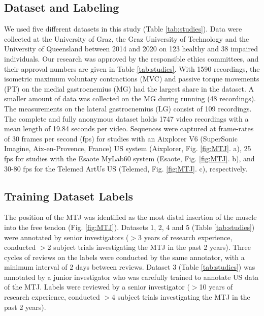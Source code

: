 \documentclass[journal,twoside,web]{ieeecolor}
\begin{document}
\subsection{Dataset and Labeling}
\label{sec:methods.data}
We used five different datasets in this study (Table \ref{tab:studies}). Data were collected at the University of Graz, the Graz University of Technology and the University of Queensland between 2014 and 2020 on 123 healthy and 38 impaired individuals. Our research was approved by the responsible ethics committees, and their approval numbers are given in Table \ref{tab:studies}. With 1590 recordings, the isometric maximum voluntary contractions (MVC) and passive torque movements (PT) on the medial gastrocnemius (MG) had the largest share in the dataset. A smaller amount of data was collected on the MG during running (48 recordings). The measurements on the lateral gastrocnemius (LG) consist of 109 recordings. The complete and fully anonymous dataset holds 1747 video recordings with a mean length of 19.84 seconds per video. Sequences were captured at frame-rates of 30 frames per second (fps) for studies with an Aixplorer V6 (SuperSonic Imagine, Aix-en-Provence, France) US system (Aixplorer, Fig. \ref{fig:MTJ}. a), 25 fps for studies with the Esaote MyLab60 system (Esaote, Fig. \ref{fig:MTJ}. b), and 30-80 fps for the Telemed ArtUs US (Telemed, Fig. \ref{fig:MTJ}. c), respectively.

\subsection*{Training Dataset Labels}
The position of the MTJ was identified as the most distal insertion of the muscle into the free tendon (Fig. \ref{fig:MTJ}). Datasets 1, 2, 4 and 5 (Table \ref{tab:studies}) were annotated by senior investigators ($>$3 years of research experience, conducted $>$2 subject trials investigating the MTJ in the past 2 years). Three cycles of reviews on the labels were conducted by the same annotator, with a minimum interval of 2 days between reviews. Dataset 3 (Table \ref{tab:studies}) was annotated by a junior investigator who was carefully trained to annotate US data of the MTJ. Labels were reviewed by a senior investigator ($>$10 years of research experience, conducted $>$4 subject trials investigating the MTJ in the past 2 years).
\end{document}
